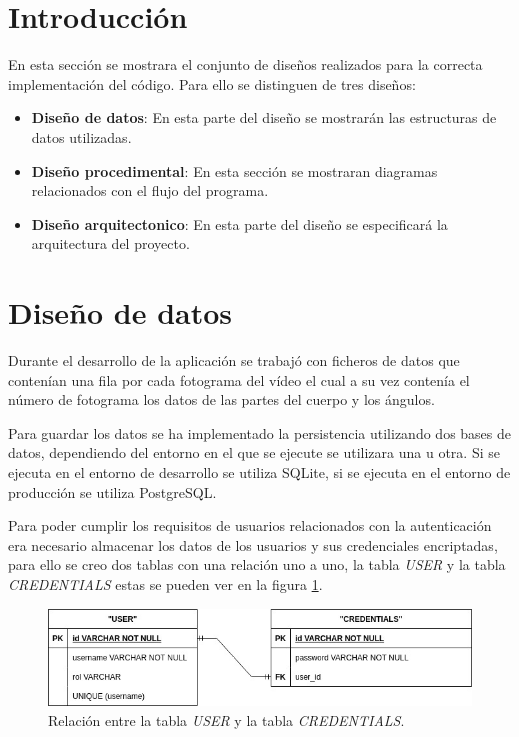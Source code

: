 
\section{Introducción}
En esta sección se mostrara el conjunto de diseños realizados para la correcta implementación del código. Para ello se distinguen de tres diseños:
\begin{itemize}
	\item \textbf{Diseño de datos}: En esta parte del diseño se mostrarán las estructuras de datos utilizadas.
	\item \textbf{Diseño procedimental}: En esta sección se mostraran diagramas relacionados con el flujo del programa.
	\item \textbf{Diseño arquitectonico}: En esta parte del diseño se especificará la arquitectura del proyecto.
\end{itemize}
\section{Diseño de datos}
Durante el desarrollo de la aplicación se trabajó con ficheros de datos que contenían una fila por cada fotograma del vídeo el cual a su vez contenía el número de fotograma los datos de las partes del cuerpo y los ángulos.

Para guardar los datos se ha implementado la persistencia utilizando dos bases de datos, dependiendo del entorno en el que se ejecute se utilizara una u otra. Si se ejecuta en el entorno de desarrollo se utiliza SQLite, si se ejecuta en el entorno de producción se utiliza PostgreSQL.

Para poder cumplir los requisitos de usuarios relacionados con la autenticación era necesario  almacenar los datos de los usuarios y sus credenciales encriptadas, para ello se creo dos tablas con una relación uno a uno, la tabla \textit{USER} y la tabla \textit{CREDENTIALS} estas se pueden ver en la figura \ref{fig:tablas-usuariocred}.

\begin{figure}
	\centering
	\includegraphics[width=0.7\linewidth]{img/tablas-UsuarioCred}
	\caption{Relación entre la tabla \textit{USER} y la tabla \textit{CREDENTIALS}.}
	\label{fig:tablas-usuariocred}
\end{figure}

